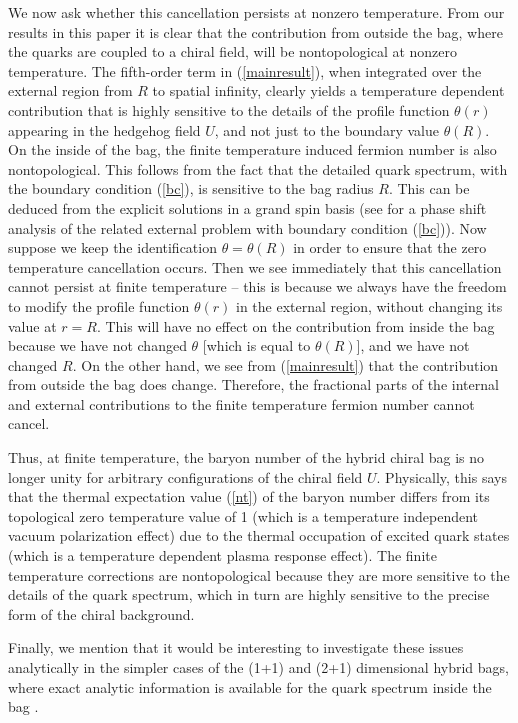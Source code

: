 \documentclass[a4paper,prd,showpacs,showkeys]{revtex4}
\begin{document}
{{We now ask whether this cancellation persists at nonzero temperature. From our results in this paper it is clear that the contribution from outside the bag, where the quarks are coupled to a chiral field, will be nontopological at nonzero temperature. The fifth-order term in (\ref{mainresult}), when integrated over the external region from $R$ to spatial infinity, clearly yields a temperature dependent contribution that is highly sensitive to the details of the profile function $\theta(r)$ appearing in the hedgehog field $U$, and not just to the boundary value $\theta(R)$. On the inside of the bag, the finite temperature induced fermion number is also nontopological. This follows from the fact that the detailed quark spectrum, with the boundary condition (\ref{bc}), is sensitive to the bag radius $R$. This can be deduced from  the explicit solutions in a grand spin basis (see \cite{farhi} for a phase shift analysis of the related external problem with boundary condition (\ref{bc})). Now suppose we keep the  identification $\theta=\theta(R)$ in order to ensure that the zero temperature cancellation occurs. Then we see immediately that this cancellation cannot persist at finite temperature -- this is because we always have the freedom to modify the profile function $\theta(r)$ in the external region, without changing its value at $r=R$. This will have no effect on the contribution from inside the bag because we have not changed $\theta$ [which is equal to $\theta(R)$], and we have not changed $R$. On the other hand, we see from (\ref{mainresult}) that the contribution from outside the bag does change. Therefore, the fractional parts of the internal and external contributions to the finite temperature fermion number cannot cancel.

Thus, at finite temperature, the baryon number of the hybrid chiral bag is no longer unity for arbitrary configurations of the chiral field $U$. Physically, this says that the thermal expectation value (\ref{nt}) of the baryon number differs from its topological zero temperature value of 1 (which is a temperature independent vacuum polarization effect) due to the thermal occupation of excited quark states (which is a temperature dependent plasma response effect). The finite temperature corrections are nontopological because they are more sensitive to the details of the quark spectrum, which in turn are highly sensitive to the precise form of the chiral background.

Finally, we mention that it would be interesting to investigate these issues analytically in the simpler cases of the (1+1) and (2+1) dimensional hybrid bags, where exact analytic information is available for the quark spectrum inside the bag \cite{zahed,wipf}.


}}
\end{document}
